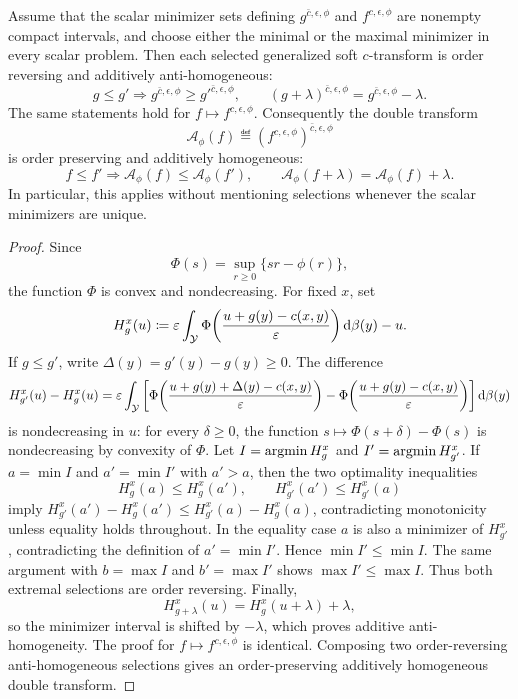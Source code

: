 \begin{prop}\label{prop-phi-double-soft-transform-monotone}
	Assume that the scalar minimizer sets defining $g^{\bar c,\epsilon,\phi}$ and $f^{c,\epsilon,\phi}$ are nonempty compact intervals, and choose either the minimal or the maximal minimizer in every scalar problem. Then each selected generalized soft $c$-transform is order reversing and additively anti-homogeneous:
	\[
		g\leq g'
		\Rightarrow
		g^{\bar c,\epsilon,\phi}\geq {g'}^{\bar c,\epsilon,\phi},
		\qquad
		(g+\lambda)^{\bar c,\epsilon,\phi}
		=
		g^{\bar c,\epsilon,\phi}-\lambda .
	\]
	The same statements hold for $f\mapsto f^{c,\epsilon,\phi}$. Consequently the double transform
	\[
		\mathcal A_\phi(f)
		\eqdef
		(f^{c,\epsilon,\phi})^{\bar c,\epsilon,\phi}
	\]
	is order preserving and additively homogeneous:
	\[
		f\leq f'
		\Rightarrow
		\mathcal A_\phi(f)\leq \mathcal A_\phi(f'),
		\qquad
		\mathcal A_\phi(f+\lambda)=\mathcal A_\phi(f)+\lambda .
	\]
	In particular, this applies without mentioning selections whenever the scalar minimizers are unique.
\end{prop}

\begin{proof}
	Since
	\[
		\Phi(s)=\sup_{r\geq0}\{sr-\phi(r)\},
	\]
	the function $\Phi$ is convex and nondecreasing. For fixed $x$, set
	\[
		H_g^x(u)
		\coloneqq
		\varepsilon
		\int_{\mathcal{Y}}
		\Phi\!\left(\frac{u+g(y)-c(x,y)}{\varepsilon}\right)
		\mathrm{d}\beta(y)
		-u .
	\]
	If $g\leq g'$, write $\Delta(y)=g'(y)-g(y)\geq0$. The difference
	\[
		H_{g'}^x(u)-H_g^x(u)
		=
		\varepsilon
		\int_{\mathcal{Y}}
		\left[
		\Phi\!\left(\frac{u+g(y)+\Delta(y)-c(x,y)}{\varepsilon}\right)
		-
		\Phi\!\left(\frac{u+g(y)-c(x,y)}{\varepsilon}\right)
		\right]\mathrm{d}\beta(y)
	\]
	is nondecreasing in $u$: for every $\delta\geq0$, the function $s\mapsto \Phi(s+\delta)-\Phi(s)$ is nondecreasing by convexity of $\Phi$. Let $I=\operatorname{argmin} H_g^x$ and $I'=\operatorname{argmin} H_{g'}^x$. If $a=\min I$ and $a'=\min I'$ with $a'>a$, then the two optimality inequalities
	\[
		H_g^x(a)\leq H_g^x(a'),
		\qquad
		H_{g'}^x(a')\leq H_{g'}^x(a)
	\]
	imply $H_{g'}^x(a')-H_g^x(a')\leq H_{g'}^x(a)-H_g^x(a)$, contradicting monotonicity unless equality holds throughout. In the equality case $a$ is also a minimizer of $H_{g'}^x$, contradicting the definition of $a'=\min I'$. Hence $\min I'\leq \min I$. The same argument with $b=\max I$ and $b'=\max I'$ shows $\max I'\leq \max I$. Thus both extremal selections are order reversing. Finally,
	\[
		H_{g+\lambda}^x(u)=H_g^x(u+\lambda)+\lambda,
	\]
	so the minimizer interval is shifted by $-\lambda$, which proves additive anti-homogeneity. The proof for $f\mapsto f^{c,\epsilon,\phi}$ is identical. Composing two order-reversing anti-homogeneous selections gives an order-preserving additively homogeneous double transform.
\end{proof}

